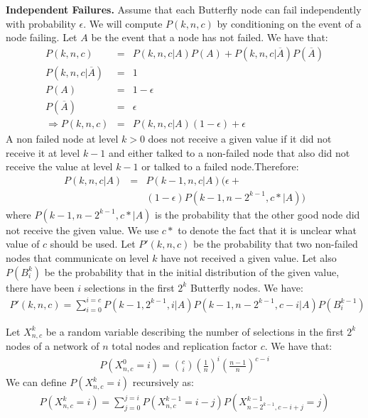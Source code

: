 \documentclass[10pt]{style}
\theoremstyle{plain}
\theoremstyle{definition}
\theoremstyle{remark}
\numberwithin{equation}{section}
\begin{document}
  {\bf Independent Failures.}
  Assume that each Butterfly node can fail independently with
  probability $\epsilon$. We will compute $P(k,n,c)$ by conditioning
  on the event of a node failing. Let $A$ be the event that a node has
  not failed. We have that:
  \begin{eqnarray*}
    P(k,n,c) &=& P(k,n,c|A)P(A) +
    P(k,n,c|\overline{A})P(\overline{A})\\
    P(k,n,c|\overline{A}) &=& 1\\
    P(A) &=& 1-\epsilon\\
    P(\overline{A})&=& \epsilon      \\
    \Rightarrow P(k,n,c) &=& P(k,n,c|A)(1-\epsilon) + \epsilon
  \end{eqnarray*}
  A non failed node at level $k > 0$ does not receive a given value if
  it did not receive it at level $k-1$ and either talked to a
  non-failed node that also did not receive the value at level
  $k-1$ or talked to a failed node.Therefore:
  \begin{eqnarray*}
    P(k,n,c|A) &=& P(k-1,n,c|A)(\epsilon +\\
    &&(1-\epsilon)P(k-1,n-2^{k-1},c*|A))
  \end{eqnarray*}
  where $P(k-1,n-2^{k-1},c*|A)$ is the probability that the other good
  node did not receive the given value. We use $c*$ to denote the fact
  that it is unclear what value of $c$ should be used. Let $P'(k, n,
  c)$ be the probability that two non-failed nodes that communicate on level
  $k$ have not received a given value. Let also $P(B_i^k)$ be the
  probability that in the initial distribution of the given value,
  there have been $i$ selections in the first $2^k$ Butterfly
  nodes. We have:
  \begin{eqnarray*}
    P'(k, n, c) = \sum_{i=0}^{i=c}P(k-1,2^{k-1},i|A)P(k-1, n-2^{k-1}, c-i|A)P(B_i^{k-1})
  \end{eqnarray*}

  Let $X_{n,c}^k$ be a random variable describing the number of
  selections in the first $2^k$ nodes of a network of $n$ total nodes
  and replication factor $c$. We have that:
  \begin{eqnarray*}
    P(X_{n,c}^0=i) = {c \choose i}(\frac{1}{n})^i(\frac{n-1}{n})^{c-i} 
  \end{eqnarray*}
  We can define $P(X_{n,c}^k=i)$ recursively as:
  \begin{eqnarray*}
    P(X_{n,c}^k=i) = \sum_{j=0}^{j=i}P(X_{n,c}^{k-1}=
    i-j)P(X_{n-2^{k-1},c-i+j}^{k-1}= j)
  \end{eqnarray*}
\end{document}
